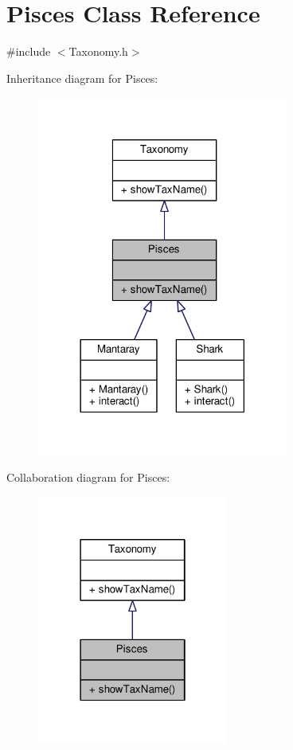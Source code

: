 \hypertarget{classPisces}{}\section{Pisces Class Reference}
\label{classPisces}


{\ttfamily \#include $<$Taxonomy.\+h$>$}



Inheritance diagram for Pisces\+:
\nopagebreak
\begin{figure}[H]
\begin{center}
\leavevmode
\includegraphics[width=234pt]{classPisces__inherit__graph}
\end{center}
\end{figure}


Collaboration diagram for Pisces\+:
\nopagebreak
\begin{figure}[H]
\begin{center}
\leavevmode
\includegraphics[width=178pt]{classPisces__coll__graph}
\end{center}
\end{figure}
